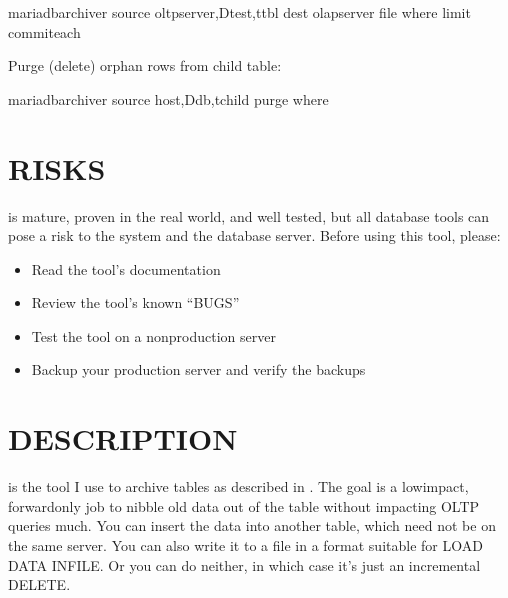 \documentclass[letterpaper,10pt,english]{sphinxmanual}
\begin{document}
\begin{sphinxVerbatim}[commandchars=\\\{\}]
mariadb\PYGZhy{}archiver \PYGZhy{}\PYGZhy{}source oltp\PYGZus{}server,Dtest,ttbl \PYGZhy{}\PYGZhy{}dest olap\PYGZus{}server 
  \PYGZhy{}\PYGZhy{}file                            
  \PYGZhy{}\PYGZhy{}where  \PYGZhy{}\PYGZhy{}limit  \PYGZhy{}\PYGZhy{}commit\PYGZhy{}each
\end{sphinxVerbatim}

Purge (delete) orphan rows from child table:

\begin{sphinxVerbatim}[commandchars=\\\{\}]
mariadb\PYGZhy{}archiver \PYGZhy{}\PYGZhy{}source host,Ddb,tchild \PYGZhy{}\PYGZhy{}purge 
  \PYGZhy{}\PYGZhy{}where 
\end{sphinxVerbatim}


\section{RISKS}
\label{\detokenize{mariadb-archiver:risks}}
 is mature, proven in the real world, and well tested,
but all database tools can pose a risk to the system and the database
server.  Before using this tool, please:
\begin{itemize}
\item {} 
Read the tool’s documentation

\item {} 
Review the tool’s known “BUGS”

\item {} 
Test the tool on a non\sphinxhyphen{}production server

\item {} 
Backup your production server and verify the backups

\end{itemize}


\section{DESCRIPTION}
\label{\detokenize{mariadb-archiver:description}}
 is the tool I use to archive tables as described in
.  The goal is a low\sphinxhyphen{}impact, forward\sphinxhyphen{}only
job to nibble old data out of the table without impacting OLTP queries much.
You can insert the data into another table, which need not be on the same
server.  You can also write it to a file in a format suitable for LOAD DATA
INFILE.  Or you can do neither, in which case it’s just an incremental DELETE.
\end{document}
